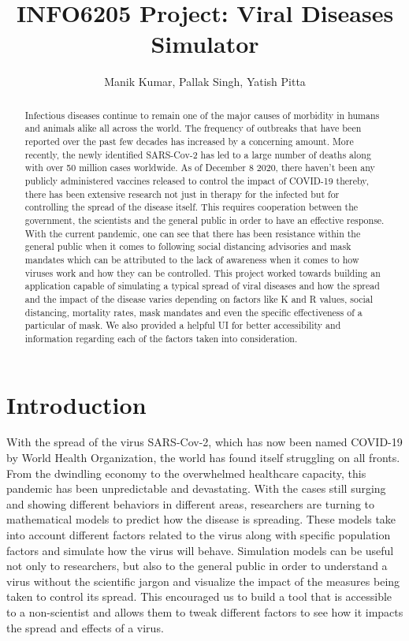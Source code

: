 \documentclass[11pt]{article}
\begin{document}
\title{\textbf{INFO6205 Project: Viral Diseases Simulator}
}
\author{Manik Kumar, Pallak Singh, Yatish Pitta}
\maketitle
\begin{abstract}
Infectious diseases continue to remain one of the major causes of morbidity in humans and animals alike all across the world. The frequency of outbreaks that have been reported over the past few decades has increased by a concerning amount. More recently, the newly identified SARS-Cov-2 has led to a large number of deaths along with over 50 million cases worldwide. As of December 8 2020, there haven't been any publicly administered vaccines released to control the impact of COVID-19 thereby, there has been extensive research not just in therapy for the infected but for controlling the spread of the disease itself. This requires cooperation between the government, the scientists and the general public in order to have an effective response. With the current pandemic, one can see that there has been resistance within the general public when it comes to following social distancing advisories and mask mandates which can be attributed to the lack of awareness when it comes to how viruses work and how they can be controlled. This project worked towards building an application capable of simulating a typical spread of viral diseases and how the spread and the impact of the disease varies depending on factors like K and R values, social distancing, mortality rates, mask mandates and even the specific effectiveness of a particular of mask. We also provided a helpful UI for better accessibility and information regarding each of the factors taken into consideration.

\end{abstract}
\pagestyle{fancy}
\renewcommand{\headrulewidth}{0pt}
\renewcommand{\footrulewidth}{0pt}
\fancyhf{}
\rfoot{\thepage}

\section{Introduction}
With the spread of the virus SARS-Cov-2, which has now been named COVID-19 by World Health Organization, the world has found itself struggling on all fronts. From the dwindling economy to the overwhelmed healthcare capacity, this pandemic has been unpredictable and devastating. With the cases still surging and showing different behaviors in different areas, researchers are turning to mathematical models to predict how the disease is spreading. These models take into account different factors related to the virus along with specific population factors and simulate how the virus will behave. Simulation models can be useful not only to researchers, but also to the general public in order to understand a virus without the scientific jargon and visualize the impact of the measures being taken to control its spread. This encouraged us to build a tool that is accessible to a non-scientist and allows them to tweak different factors to see how it impacts the spread and effects of a virus. 
\end{document}
